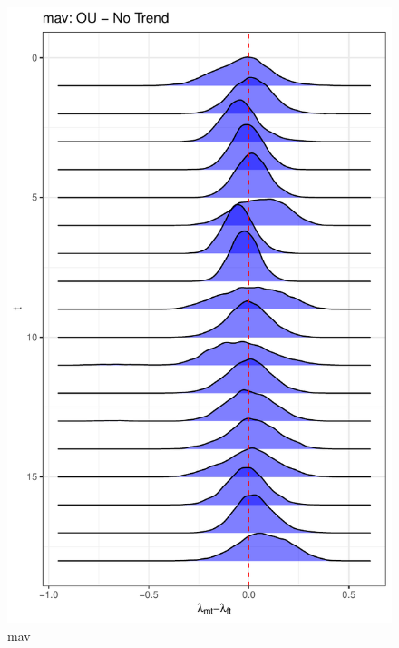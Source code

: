 \documentclass[
  12pt,
]{article}
\begin{document}
\begin{figure}

{\centering \includegraphics[width=0.9\linewidth]{../Figures/mav/lambda_diff} 

}

\caption{mav}\label{fig:unnamed-chunk-14}
\end{figure}
\end{document}
